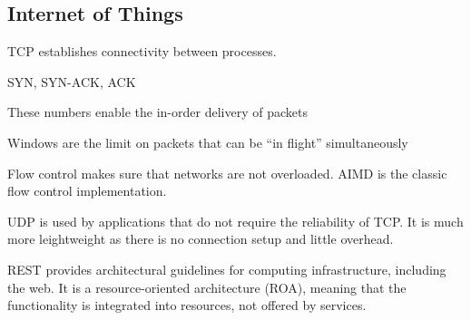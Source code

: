 \subsection{Internet of Things}
\begin{mytitle} TCP establishes connectivity between processes. 
    \begin{mysubtitle} SYN, SYN-ACK, ACK
    \end{mysubtitle}
    \begin{mysubtitle} These numbers enable the in-order delivery of packets
    \end{mysubtitle}
    \begin{mysubtitle}[Window] Windows are the limit on packets that can be ``in flight'' simultaneously
    \end{mysubtitle}
    \begin{mysubtitle} Flow control makes sure that networks are not overloaded. AIMD is the classic flow control implementation.
    \end{mysubtitle}
\end{mytitle}
\begin{mytitle} UDP is used by applications that do not require the reliability of TCP. It is much more leightweight as there is no connection setup and little overhead.
\end{mytitle}
\begin{mytitle} REST provides architectural guidelines for computing infrastructure, including the web. It is a resource-oriented architecture (ROA), meaning that the functionality is integrated into resources, not offered by services. 
\end{mytitle}
